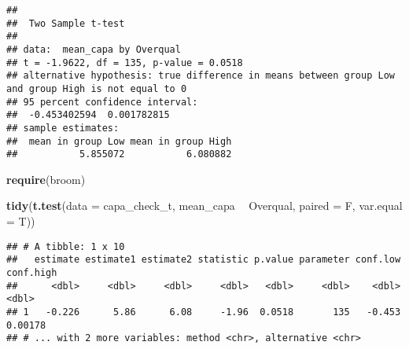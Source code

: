 \documentclass[]{article}
\newenvironment{Shaded}{\begin{snugshade}}{\end{snugshade}}
\newcommand{\CommentTok}[1]{\textcolor[rgb]{0.56,0.35,0.01}{\textit{#1}}}
\newcommand{\DataTypeTok}[1]{\textcolor[rgb]{0.13,0.29,0.53}{#1}}
\newcommand{\KeywordTok}[1]{\textcolor[rgb]{0.13,0.29,0.53}{\textbf{#1}}}
\newcommand{\NormalTok}[1]{#1}
\newcommand{\OperatorTok}[1]{\textcolor[rgb]{0.81,0.36,0.00}{\textbf{#1}}}
\newcommand{\StringTok}[1]{\textcolor[rgb]{0.31,0.60,0.02}{#1}}
\begin{document}
\begin{verbatim}
## 
##  Two Sample t-test
## 
## data:  mean_capa by Overqual
## t = -1.9622, df = 135, p-value = 0.0518
## alternative hypothesis: true difference in means between group Low and group High is not equal to 0
## 95 percent confidence interval:
##  -0.453402594  0.001782815
## sample estimates:
##  mean in group Low mean in group High 
##           5.855072           6.080882
\end{verbatim}

\begin{Shaded}
\begin{Highlighting}[]
\KeywordTok{require}\NormalTok{(broom)}

\KeywordTok{tidy}\NormalTok{(}\KeywordTok{t.test}\NormalTok{(}\DataTypeTok{data =}\NormalTok{ capa_check_t, mean_capa }\OperatorTok{~}\StringTok{ }\NormalTok{Overqual, }\DataTypeTok{paired =}\NormalTok{ F, }\DataTypeTok{var.equal =}\NormalTok{ T))}
\end{Highlighting}
\end{Shaded}

\begin{verbatim}
## # A tibble: 1 x 10
##   estimate estimate1 estimate2 statistic p.value parameter conf.low conf.high
##      <dbl>     <dbl>     <dbl>     <dbl>   <dbl>     <dbl>    <dbl>     <dbl>
## 1   -0.226      5.86      6.08     -1.96  0.0518       135   -0.453   0.00178
## # ... with 2 more variables: method <chr>, alternative <chr>
\end{verbatim}

\begin{Shaded}
\end{Shaded}
\end{document}
